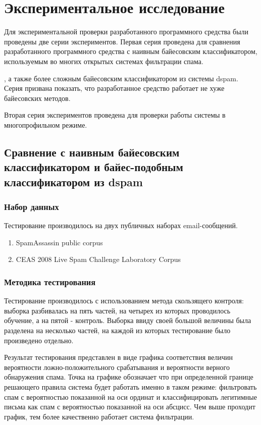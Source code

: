 \section{Экспериментальное исследование}

Для экспериментальной проверки разработанного программного средства были проведены две серии экспериментов. Первая серия проведена для сравнения разработанного программного средства с наивным байесовским классификатором, используемым во многих открытых системах фильтрации спама.

, а также более сложным байесовским классификатором из системы dspam. Серия призвана показать, что разработанное средство работает не хуже байесовских методов.

Вторая серия экспериментов проведена для проверки работы системы в многопрофильном режиме.

\subsection{Сравнение с наивным байесовским классификатором и байес-подобным классификатором из dspam}

\subsubsection {Набор данных}

Тестирование производилось на двух публичных наборах email-сообщений.

\begin{enumerate}
	\item SpamAssassin public corpus \cite{SAPC}
	\item CEAS 2008 Live Spam Challenge Laboratory Corpus \cite{CEAS}
\end{enumerate}

\subsubsection{Методика тестирования}

Тестирование производилось с использованием метода скользящего контроля: выборка разбивалась на пять частей, на четырех из которых проводилось обучение, а на пятой - контроль. Выборка \cite{CEAS} ввиду своей большой величины была разделена на несколько частей, на каждой из которых тестирование было произведено отдельно. 

Результат тестирования представлен в виде графика соответствия величин вероятности ложно-положительного срабатывания и вероятности верного обнаружения спама. Точка на графике обозначает что при определенной границе решающего правила система будет работать именно в таком режиме: фильтровать спам с вероятностью показанной на оси ординат и классифицировать легитимные письма как спам с вероятностью показанной на оси абсцисс. Чем выше проходит график, тем более качественно работает система фильтрации.

